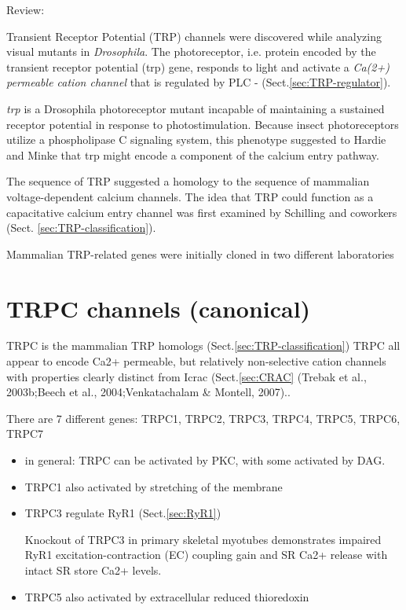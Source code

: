 Review: \citep{ramsey2006}

Transient Receptor Potential (TRP) channels were discovered while analyzing
visual mutants in {\it Drosophila}. The photoreceptor, i.e. protein encoded by
the transient receptor potential (trp) gene, responds to light and activate a
{\it Ca(2+) permeable cation channel} that is regulated by PLC -
(Sect.\ref{sec:TRP-regulator}).



{\it trp} is a Drosophila photoreceptor mutant incapable of maintaining a
sustained receptor potential in response to photostimulation.
Because insect photoreceptors utilize a phospholipase C signaling system, this
phenotype suggested to Hardie and Minke that trp might encode a component of the
calcium entry pathway.

The sequence of TRP suggested a homology to the sequence of mammalian
voltage-dependent calcium channels. The idea that TRP could function as a
capacitative calcium entry channel was first examined by Schilling and
coworkers (Sect. \ref{sec:TRP-classification}).

Mammalian TRP-related genes were initially cloned in two
different laboratories

\section{TRPC channels (canonical)}
\label{sec:TRPC}

TRPC is the mammalian TRP homologs (Sect.\ref{sec:TRP-classification}) TRPC all
appear to encode Ca2+ permeable, but relatively non-selective cation channels
with properties clearly distinct from Icrac (Sect.\ref{sec:CRAC} (Trebak et al.,
2003b;Beech et al., 2004;Venkatachalam \& Montell, 2007)..

There are 7 different genes: TRPC1, TRPC2, TRPC3, TRPC4, TRPC5, TRPC6, TRPC7
\begin{itemize}
  \item in general: TRPC can be activated by PKC, with some activated by DAG.
  
  \item TRPC1 also activated by stretching of the membrane
  
  \item TRPC3 regulate RyR1 (Sect.\ref{sec:RyR1})

Knockout of TRPC3 in primary skeletal myotubes demonstrates impaired RyR1
excitation-contraction (EC) coupling gain and SR Ca2+ release with intact SR
store Ca2+ levels.
  
  \item TRPC5 also activated by extracellular reduced thioredoxin
  
\end{itemize}

